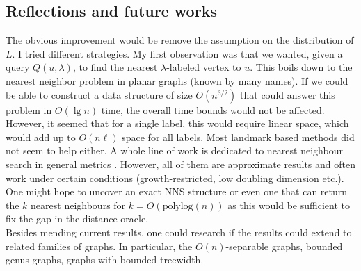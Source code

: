 \subsection{Reflections and future works}
The obvious improvement would be remove the assumption on the distribution of $L$. I
tried different strategies. My first observation was that we wanted, given a query
$Q(u,\lambda)$, to find the nearest $\lambda$-labeled vertex to $u$. This boils down to
the nearest neighbor problem in planar graphs (known by many names). If we could be able to construct a data structure
of size $O(n^{3/2})$ that could answer this problem in $O(\lg n)$ time, the overall time
bounds would not be affected. However, it seemed that for a single label, this would
require linear space, which would add up to $O(n\ell)$ space for all labels. Most
landmark based methods did not seem to help either. A whole line of work is dedicated to
nearest neighbour search in general metrics
\cite{krauthgamer2004navigating}\cite{krauthgamer2005black}\cite{karger2002finding}\cite{plaxton1999accessing}\cite{beygelzimer2006cover}\cite{cole2006searching}.
However, all of them are approximate results and often work under certain conditions
(growth-restricted, low doubling dimension etc.). One might hope to uncover an exact NNS
structure or even one that can return the $k$ nearest neighbours for
$k=O(\text{polylog}(n))$ as this would be sufficient to fix the gap in the distance
oracle. \\
Besides mending current results, one could research if the results could extend to related
families of graphs. In particular, the $O(n)$-separable graphs, bounded genus graphs,
graphs with bounded treewidth.
